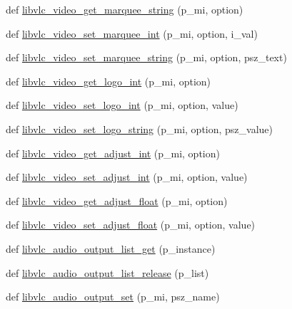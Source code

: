 \begin{DoxyCompactItemize}
\item 
def \hyperlink{namespacesrc_1_1lib_1_1vlc_aec00f7a3fc121dc828d3afeaa7130ae9}{libvlc\+\_\+video\+\_\+get\+\_\+marquee\+\_\+string} (p\+\_\+mi, option)
\item 
def \hyperlink{namespacesrc_1_1lib_1_1vlc_a8e33ec6e54c1d2f289152631c5a934c2}{libvlc\+\_\+video\+\_\+set\+\_\+marquee\+\_\+int} (p\+\_\+mi, option, i\+\_\+val)
\item 
def \hyperlink{namespacesrc_1_1lib_1_1vlc_a1d629f8f21de1aff4819a5077407f8ad}{libvlc\+\_\+video\+\_\+set\+\_\+marquee\+\_\+string} (p\+\_\+mi, option, psz\+\_\+text)
\item 
def \hyperlink{namespacesrc_1_1lib_1_1vlc_a1483facd335a60c0389582e28d07cd22}{libvlc\+\_\+video\+\_\+get\+\_\+logo\+\_\+int} (p\+\_\+mi, option)
\item 
def \hyperlink{namespacesrc_1_1lib_1_1vlc_ad2bd089a141edddb62db6f8495f0a2dd}{libvlc\+\_\+video\+\_\+set\+\_\+logo\+\_\+int} (p\+\_\+mi, option, value)
\item 
def \hyperlink{namespacesrc_1_1lib_1_1vlc_a5cf7825c62b83ac9875cd9641cd2df8e}{libvlc\+\_\+video\+\_\+set\+\_\+logo\+\_\+string} (p\+\_\+mi, option, psz\+\_\+value)
\item 
def \hyperlink{namespacesrc_1_1lib_1_1vlc_aa95d7f7f81d195f9cab51a2fbdf29e0e}{libvlc\+\_\+video\+\_\+get\+\_\+adjust\+\_\+int} (p\+\_\+mi, option)
\item 
def \hyperlink{namespacesrc_1_1lib_1_1vlc_a4308cfc4326f39f2b0ca5f202ce52994}{libvlc\+\_\+video\+\_\+set\+\_\+adjust\+\_\+int} (p\+\_\+mi, option, value)
\item 
def \hyperlink{namespacesrc_1_1lib_1_1vlc_a81a886cf8ba641bf1eb3c5c8e35fe87d}{libvlc\+\_\+video\+\_\+get\+\_\+adjust\+\_\+float} (p\+\_\+mi, option)
\item 
def \hyperlink{namespacesrc_1_1lib_1_1vlc_ae1b8230f11d3e98f482206adc6b0a54c}{libvlc\+\_\+video\+\_\+set\+\_\+adjust\+\_\+float} (p\+\_\+mi, option, value)
\item 
def \hyperlink{namespacesrc_1_1lib_1_1vlc_a81556668734e063ed22f71576978940e}{libvlc\+\_\+audio\+\_\+output\+\_\+list\+\_\+get} (p\+\_\+instance)
\item 
def \hyperlink{namespacesrc_1_1lib_1_1vlc_a798f99cacf59f9fb8bd570647e4e59ea}{libvlc\+\_\+audio\+\_\+output\+\_\+list\+\_\+release} (p\+\_\+list)
\item 
def \hyperlink{namespacesrc_1_1lib_1_1vlc_a03ef010fead8db9f88ccefc28722d8ab}{libvlc\+\_\+audio\+\_\+output\+\_\+set} (p\+\_\+mi, psz\+\_\+name)
\item 

\end{DoxyCompactItemize}
